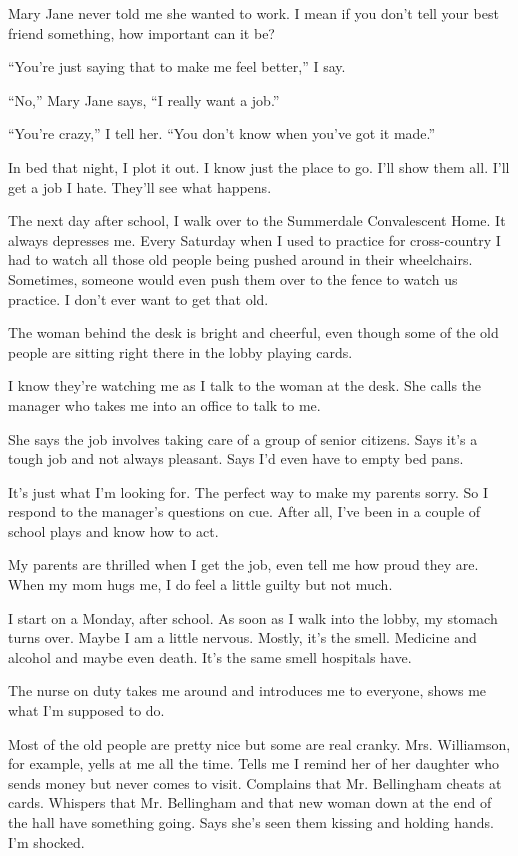 \documentclass[twoside,10pt]{book}
\begin{document}
Mary Jane never told me she wanted to work. I mean if you don't tell
your best friend some­thing, how important can it be?

``You're just saying that to make me feel better,'' I say.

``No,'' Mary Jane says, ``I really want a job.''

``You're crazy,'' I tell her. ``You don't know when you've got it
made.''

In bed that night, I plot it out. I know just the place to go. I'll show
them all. I'll get a job I hate. They'll see what happens.

The next day after school, I walk over to the Summerdale Convalescent
Home. It always depresses me. Every Saturday when I used to practice for
cross-country I had to watch all those old people being pushed around in
their wheelchairs. Sometimes, someone would even push them over to the
fence to watch us practice. I don't ever want to get that old.

The woman behind the desk is bright and cheerful, even though some of
the old people are sitting right there in the lobby playing cards.

I know they're watching me as I talk to the woman at the desk. She calls
the manager who takes me into an office to talk to me.

She says the job involves taking care of a group of senior citizens.
Says it's a tough job and not always pleasant. Says I'd even have to
empty bed pans.

It's just what I'm looking for. The perfect way to make my parents
sorry. So I respond to the manager's questions on cue. After all, I've
been in a couple of school plays and know how to act.

My parents are thrilled when I get the job, even tell me how proud they
are. When my mom hugs me, I do feel a little guilty but not much.

I start on a Monday, after school. As soon as I walk into the lobby, my
stomach turns over. Maybe I am a little nervous. Mostly, it's the smell.
Medicine and alcohol and maybe even death. It's the same smell hospitals
have.

The nurse on duty takes me around and introduces me to everyone, shows
me what I'm sup­posed to do.

Most of the old people are pretty nice but some are real cranky. Mrs.
Williamson, for exam­ple, yells at me all the time. Tells me I remind
her of her daughter who sends money but never comes to visit. Complains
that Mr. Bellingham cheats at cards. Whispers that Mr. Bellingham and
that new woman down at the end of the hall have something going. Says
she's seen them kissing and holding hands. I'm shocked.
\end{document}
